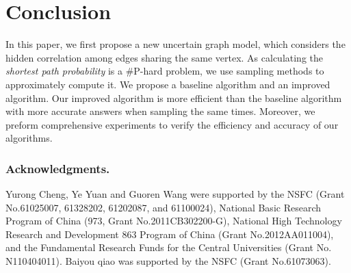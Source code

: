 \documentclass[runningheads,a4paper]{llncs}
\begin{document}
\vspace{-0.3cm}
%
\section{Conclusion}
%
\label{sec:conclu}
\vspace{-0.2cm}

In this paper, we first propose a new uncertain graph model, which considers the hidden correlation among edges sharing the same vertex. As calculating the \emph{shortest path probability} is a \#P-hard problem, we use sampling methods to approximately compute it. We propose a baseline algorithm and an improved algorithm. Our improved algorithm is more efficient than the baseline algorithm with more accurate answers when sampling the same times. Moreover, we preform comprehensive experiments to verify the efficiency and accuracy of our algorithms.


\vspace{-0.3cm}
\subsubsection*{Acknowledgments.} Yurong Cheng, Ye Yuan and Guoren Wang were supported by the NSFC
(Grant No.61025007, 61328202, 61202087, and 61100024), National Basic Research Program of China (973, Grant No.2011CB302200-G), National High Technology Research and Development 863 Program of China (Grant No.2012AA011004), and the Fundamental Research Funds for the Central Universities (Grant No. N110404011). Baiyou qiao was supported by the NSFC (Grant No.61073063).



\end{document}
